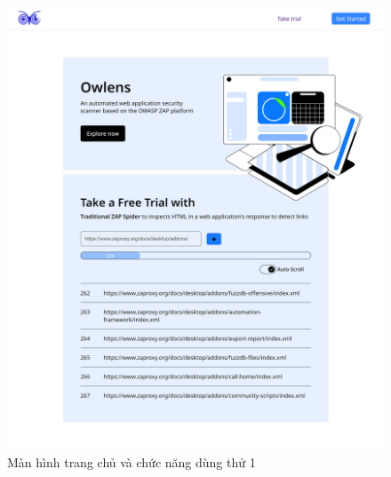 \begin{figure}[H]
      \centering
      \includegraphics[width=\textwidth]{applied-thesis-chapters/chapter-6/Màn hình trang chủ và chức năng dùng thử 1.png}
      \caption{Màn hình trang chủ và chức năng dùng thử 1}
      \label{fig:ManHinhTrangChuVaChucNangDungThu1}
\end{figure}

